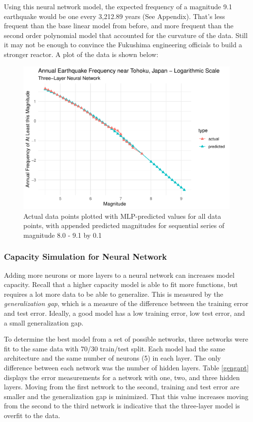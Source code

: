 Using this neural network model, the expected frequency of a magnitude
9.1 earthquake would be one every 3,212.89 years (See Appendix).  That's less frequent than the base linear model from before, and more frequent than the second order polynomial model that accounted for the curvature of the data.  Still it may not be enough to convince the Fukushima engineering officials to build a stronger reactor.  A plot of the data is shown below:

\begin{figure}[H]
    \center
    \includegraphics[width=0.8\linewidth]{earthquakes_files/figure-latex/unnamed-chunk-8-1.pdf}
    \caption{\footnotesize{Actual data points plotted with MLP-predicted values for all data points, with appended predicted magnitudes for sequential series of magnitude 8.0 - 9.1 by 0.1}}
    \label{tohoku_mlp}
\end{figure}


\subsubsection{Capacity Simulation for Neural Network}

Adding more neurons or more layers to a neural network can increases model capacity. Recall that a higher capacity model is able to fit more functions, but requires a lot more data to be able to generalize.  This is measured by the \textit{generalization gap}, which is a measure of the difference between the training error and test error. Ideally, a good model has a low training error, low test error, and a small generalization gap.

To determine the best model from a set of possible networks, three networks were fit to the same data with 70/30 train/test split.  Each model had the same architecture and the same number of neurons (5) in each layer.  The only difference between each network was the number of hidden layers. Table \ref{gengapt} displays the error measurements for a network with one, two, and three hidden layers. Moving from the first network to the second, training and test error are smaller and the generalization gap is minimized.  That this value increases moving from the second to the third network is indicative that the three-layer model is overfit to the data.


